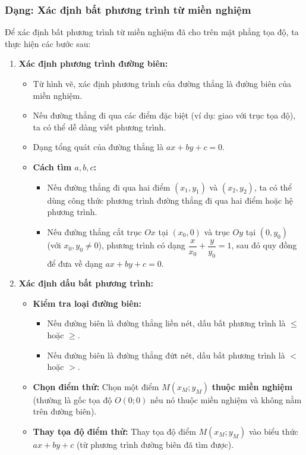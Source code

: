 \subsubsection{Dạng: Xác định bất phương trình từ miền nghiệm}
\begin{phuongphap}
Để xác định bất phương trình từ miền nghiệm đã cho trên mặt phẳng tọa độ, ta thực hiện các bước sau:
\begin{enumerate}
    \item \textbf{Xác định phương trình đường biên:}
    \begin{itemize}
        \item Từ hình vẽ, xác định phương trình của đường thẳng là đường biên của miền nghiệm.
        \item Nếu đường thẳng đi qua các điểm đặc biệt (ví dụ: giao với trục tọa độ), ta có thể dễ dàng viết phương trình.
        \item Dạng tổng quát của đường thẳng là $ax+by+c=0$.
        \item \textbf{Cách tìm $a, b, c$:}
        \begin{itemize}
            \item Nếu đường thẳng đi qua hai điểm $(x_1, y_1)$ và $(x_2, y_2)$, ta có thể dùng công thức phương trình đường thẳng đi qua hai điểm hoặc hệ phương trình.
            \item Nếu đường thẳng cắt trục $Ox$ tại $(x_0, 0)$ và trục $Oy$ tại $(0, y_0)$ (với $x_0, y_0 \ne 0$), phương trình có dạng $\dfrac{x}{x_0} + \dfrac{y}{y_0} = 1$, sau đó quy đồng để đưa về dạng $ax+by+c=0$.
        \end{itemize}
    \end{itemize}
    \item \textbf{Xác định dấu bất phương trình:}
    \begin{itemize}
        \item \textbf{Kiểm tra loại đường biên:}
        \begin{itemize}
            \item Nếu đường biên là đường thẳng liền nét, dấu bất phương trình là $\le$ hoặc $\ge$.
            \item Nếu đường biên là đường thẳng đứt nét, dấu bất phương trình là $<$ hoặc $>$.
        \end{itemize}
        \item \textbf{Chọn điểm thử:} Chọn một điểm $M(x_M; y_M)$ \textbf{thuộc miền nghiệm} (thường là gốc tọa độ $O(0;0)$ nếu nó thuộc miền nghiệm và không nằm trên đường biên).
        \item \textbf{Thay tọa độ điểm thử:} Thay tọa độ điểm $M(x_M; y_M)$ vào biểu thức $ax+by+c$ (từ phương trình đường biên đã tìm được).

\end{itemize}
\end{enumerate}
\end{phuongphap}
